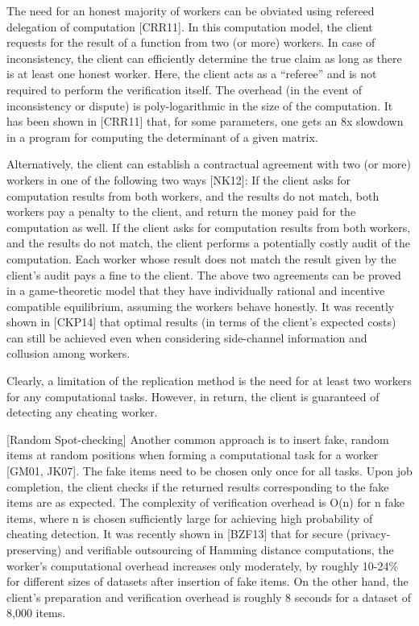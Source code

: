 The need for an honest majority of workers can be obviated using refereed delegation of computation [CRR11]. In this computation model, the client requests for the result of a function from two (or more) workers. In case of inconsistency, the client can efficiently determine the true claim as long as there is at least one honest worker. Here, the client acts as a ``referee'' and is not required to perform the verification itself. The overhead (in the event of inconsistency or dispute) is poly-logarithmic in the size of the computation. It has been shown in [CRR11] that, for some parameters, one gets an 8x slowdown in a program for computing the determinant of a given matrix.

Alternatively, the client can establish a contractual agreement with two (or more) workers in one of the following two ways [NK12]:
If the client asks for computation results from both workers, and the results do not match, both workers pay a penalty to the client, and return the money paid for the computation as well.
If the client asks for computation results from both workers, and the results do not match, the client performs a potentially costly audit of the computation. Each worker whose result does not match the result given by the client's audit pays a fine to the client.
The above two agreements can be proved in a game-theoretic model that they have individually rational and incentive compatible equilibrium, assuming the workers behave honestly. It was recently shown in [CKP14] that optimal results (in terms of the client's expected costs) can still be achieved even when considering side-channel information and collusion among workers.

Clearly, a limitation of the replication method is the need for at least two workers for any computational tasks. However, in return, the client is guaranteed of detecting any cheating worker.

[Random Spot-checking]
Another common approach is to insert fake, random items at random positions when forming a computational task for a worker [GM01, JK07]. The fake items need to be chosen only once for all tasks. Upon job completion, the client checks if the returned results corresponding to the fake items are as expected. The complexity of verification overhead is O(n) for n fake items, where n is chosen sufficiently large for achieving high probability of cheating detection. It was recently shown in [BZF13] that for secure (privacy-preserving) and verifiable outsourcing of Hamming distance computations, the worker's computational overhead increases only moderately, by roughly 10-24\% for different sizes of datasets after insertion of fake items. On the other hand, the client's preparation and verification overhead is roughly 8 seconds for a dataset of 8,000 items.


